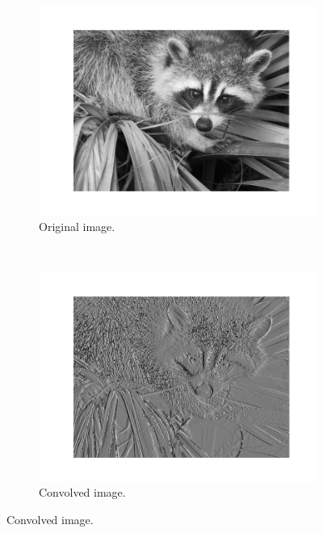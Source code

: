         \begin{figure}[!ht]
            \centering
            \begin{subfigure}[t]{0.5\textwidth}
                \centering
                \includegraphics[width=\textwidth]{images/face.png}
                \caption{Original image.}
                \label{fig:convolution-face-original}
            \end{subfigure}%
            ~
            \begin{subfigure}[t]{0.5\textwidth}
                \centering
                \includegraphics[width=\textwidth]{images/face_convolved.png}
                \caption{Convolved image.}
                \label{fig:convolution-face-convolved}

\end{subfigure}
\end{figure}

